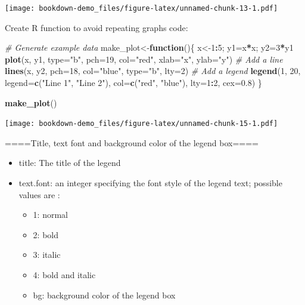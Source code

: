 \documentclass[]{book}
\newenvironment{Shaded}{\begin{snugshade}}{\end{snugshade}}
\newcommand{\KeywordTok}[1]{\textcolor[rgb]{0.13,0.29,0.53}{\textbf{#1}}}
\newcommand{\DataTypeTok}[1]{\textcolor[rgb]{0.13,0.29,0.53}{#1}}
\newcommand{\DecValTok}[1]{\textcolor[rgb]{0.00,0.00,0.81}{#1}}
\newcommand{\FloatTok}[1]{\textcolor[rgb]{0.00,0.00,0.81}{#1}}
\newcommand{\StringTok}[1]{\textcolor[rgb]{0.31,0.60,0.02}{#1}}
\newcommand{\CommentTok}[1]{\textcolor[rgb]{0.56,0.35,0.01}{\textit{#1}}}
\newcommand{\ControlFlowTok}[1]{\textcolor[rgb]{0.13,0.29,0.53}{\textbf{#1}}}
\newcommand{\OperatorTok}[1]{\textcolor[rgb]{0.81,0.36,0.00}{\textbf{#1}}}
\newcommand{\NormalTok}[1]{#1}
\providecommand{\tightlist}{%
  \setlength{\itemsep}{0pt}\setlength{\parskip}{0pt}}
\begin{document}
\texttt{[image: bookdown-demo\_files/figure-latex/unnamed-chunk-13-1.pdf]}

Create R function to avoid repeating graphs code:

\begin{Shaded}
\begin{Highlighting}[]
\CommentTok{# Generate example data}
\NormalTok{make_plot<-}\ControlFlowTok{function}\NormalTok{()\{}
\NormalTok{x<-}\DecValTok{1}\OperatorTok{:}\DecValTok{5}\NormalTok{; y1=x}\OperatorTok{*}\NormalTok{x; y2=}\DecValTok{3}\OperatorTok{*}\NormalTok{y1}
\KeywordTok{plot}\NormalTok{(x, y1, }\DataTypeTok{type=}\StringTok{"b"}\NormalTok{, }\DataTypeTok{pch=}\DecValTok{19}\NormalTok{, }\DataTypeTok{col=}\StringTok{"red"}\NormalTok{, }\DataTypeTok{xlab=}\StringTok{"x"}\NormalTok{, }\DataTypeTok{ylab=}\StringTok{"y"}\NormalTok{)}
\CommentTok{# Add a line}
\KeywordTok{lines}\NormalTok{(x, y2, }\DataTypeTok{pch=}\DecValTok{18}\NormalTok{, }\DataTypeTok{col=}\StringTok{"blue"}\NormalTok{, }\DataTypeTok{type=}\StringTok{"b"}\NormalTok{, }\DataTypeTok{lty=}\DecValTok{2}\NormalTok{)}
\CommentTok{# Add a legend}
\KeywordTok{legend}\NormalTok{(}\DecValTok{1}\NormalTok{, }\DecValTok{20}\NormalTok{, }\DataTypeTok{legend=}\KeywordTok{c}\NormalTok{(}\StringTok{"Line 1"}\NormalTok{, }\StringTok{"Line 2"}\NormalTok{),}
       \DataTypeTok{col=}\KeywordTok{c}\NormalTok{(}\StringTok{"red"}\NormalTok{, }\StringTok{"blue"}\NormalTok{), }\DataTypeTok{lty=}\DecValTok{1}\OperatorTok{:}\DecValTok{2}\NormalTok{, }\DataTypeTok{cex=}\FloatTok{0.8}\NormalTok{)}
\NormalTok{\}}
\end{Highlighting}
\end{Shaded}

\begin{Shaded}
\begin{Highlighting}[]
\KeywordTok{make_plot}\NormalTok{()}
\end{Highlighting}
\end{Shaded}

\texttt{[image: bookdown-demo\_files/figure-latex/unnamed-chunk-15-1.pdf]}

====Title, text font and background color of the legend box====

\begin{itemize}
\tightlist
\item
  title: The title of the legend
\item
  text.font: an integer specifying the font style of the legend text;
  possible values are :

  \begin{itemize}
  \tightlist
  \item
    1: normal
  \item
    2: bold
  \item
    3: italic
  \item
    4: bold and italic
  \item
    bg: background color of the legend box
  \end{itemize}
\end{itemize}
\end{document}

